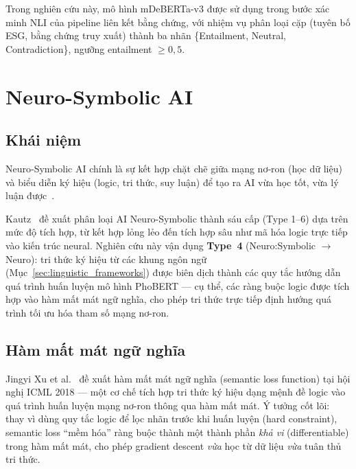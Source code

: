 Trong nghiên cứu này, mô hình mDeBERTa-v3 được sử dụng trong bước xác minh NLI của pipeline liên kết bằng chứng, với nhiệm vụ phân loại cặp (tuyên bố ESG, bằng chứng truy xuất) thành ba nhãn \{Entailment, Neutral, Contradiction\}, ngưỡng entailment $\geq 0{,}5$.


\section{Neuro-Symbolic AI}
\label{sec:neuro_symbolic}

\subsection{Khái niệm}
\label{subsec:neuro_symbolic_overview}

Neuro‑Symbolic AI chính là sự kết hợp chặt chẽ giữa mạng nơ‑ron (học dữ liệu) và biểu diễn ký hiệu (logic, tri thức, suy luận) để tạo ra AI vừa học tốt, vừa lý luận được~\cite{kautz2022third}.

Kautz~\cite{kautz2022third} đề xuất phân loại AI Neuro-Symbolic thành sáu cấp (Type 1--6) dựa trên mức độ tích hợp, từ kết hợp lỏng lẻo đến tích hợp sâu như mã hóa logic trực tiếp vào kiến trúc neural. Nghiên cứu này vận dụng \textbf{Type~4} (Neuro:Symbolic $\rightarrow$ Neuro): tri thức ký hiệu từ các khung ngôn ngữ (Mục~\ref{sec:linguistic_frameworks}) được biên dịch thành các quy tắc hướng dẫn quá trình huấn luyện mô hình PhoBERT --- cụ thể, các ràng buộc logic được tích hợp vào hàm mất mát ngữ nghĩa, cho phép tri thức trực tiếp định hướng quá trình tối ưu hóa tham số mạng nơ-ron.



\subsection{Hàm mất mát ngữ nghĩa}
\label{subsec:semantic_loss}

Jingyi Xu et al.~\cite{xu2018semantic} đề xuất hàm mất mát ngữ nghĩa (semantic loss function) tại hội nghị ICML 2018 --- một cơ chế tích hợp tri thức ký hiệu dạng mệnh đề logic vào quá trình huấn luyện mạng nơ-ron thông qua hàm mất mát. Ý tưởng cốt lõi: thay vì dùng quy tắc logic để lọc nhãn trước khi huấn luyện (hard constraint), semantic loss ``mềm hóa'' ràng buộc thành một thành phần \textit{khả vi} (differentiable) trong hàm mất mát, cho phép gradient descent \textit{vừa} học từ dữ liệu \textit{vừa} tuân thủ tri thức.


